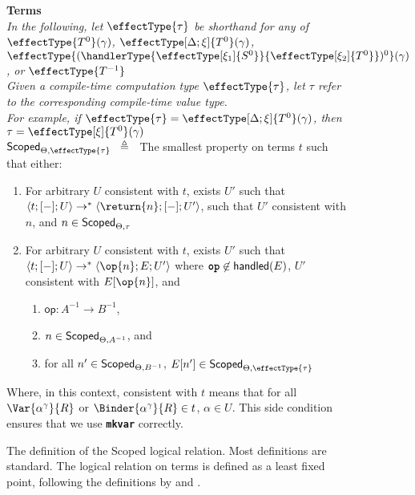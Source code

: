 \begin{figure}
\begin{rec-desc}
\textbf{Terms}\\
{\scriptsize{\textit{In the following, let $\effectType{\tau}$ be shorthand for any of $\effectType{T^{0}} (\gamma)$, $\effectType[\Delta; \xi]{T^{0}} (\gamma)$, $\effectType{(\handlerType{\effectType[\xi_1]{S^0}}{\effectType[\xi_2]{T^0}})^{0}} (\gamma)$, or $\effectType{T^{-1}}$}}}\\
{\scriptsize{\textit{Given a compile-time computation type $\effectType{\tau}$, let $\tau$ refer to the corresponding compile-time value type.}}}\\
{\scriptsize{\textit{For example, if $\effectType{\tau} = \effectType[\Delta; \xi]{T^{0}} (\gamma)$, then $\tau = \effectType[\xi]{T^{0}} (\gamma)$}}}\\

$\scoped{\effectType{\tau}} \hspace{2mm} \triangleq \hspace{2mm}$ The smallest property on terms $t$ such that either:
\begin{enumerate}
  \item For arbitrary $U$ consistent with $t$, exists $U'$ such that $\langle t;[-];U \rangle \to^{*} \langle \return{n}; [-]; U' \rangle$, such that $U'$ consistent with $n$, and $n \in \textsf{Scoped}_{{\Theta}, {\tau}}$ 
  \item For arbitrary $U$ consistent with $t$, exists $U'$ such that $\langle t;[-];U \rangle \to^{*} \langle \op{n}; E; U' \rangle$ where $\textbf{\texttt{op}} \not\in \textsf{handled}(E)$, $U'$ consistent with $E[\op{n}]$, and 
  \begin{enumerate}
    \item $\textsf{op}: A^{-1} \to B^{-1}$,
    \item $n \in \textsf{Scoped}_{{\Theta}, {A^{-1}}}$, and 
    \item for all $n' \in \textsf{Scoped}_{{\Theta}, {B^{-1}}}$, $E[n'] \in \scoped{\effectType{\tau}}$
  \end{enumerate}
\end{enumerate}
Where, in this context, consistent with $t$ means that for all $\Var{\alpha^\gamma}{R}$ or $\Binder{\alpha^\gamma}{R} \in t$, $\alpha \in U$. This side condition ensures that we use \textbf{\texttt{mkvar}} correctly.
\end{rec-desc}
\caption{The definition of the \textsf{Scoped} logical relation. Most definitions are standard. The logical relation on terms is defined as a least fixed point, following the definitions by \citet{plotkin-2025} and \citet{kuchta-2023}.}
\label{fig:logical-relation-defn}
\end{figure}

